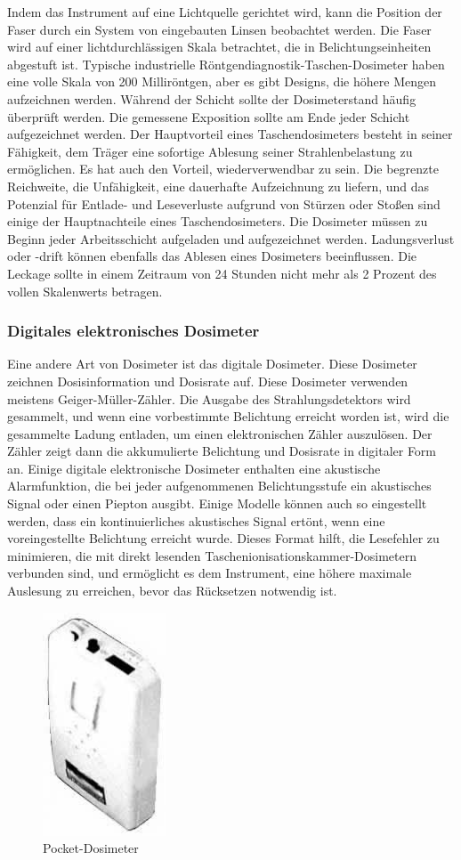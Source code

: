 {Indem das Instrument auf eine Lichtquelle gerichtet wird, kann die Position der Faser durch ein System von eingebauten Linsen beobachtet werden. Die Faser wird auf einer lichtdurchlässigen Skala betrachtet, die in Belichtungseinheiten abgestuft ist. Typische industrielle Röntgendiagnostik-Taschen-Dosimeter haben eine volle Skala von 200 Milliröntgen, aber es gibt Designs, die höhere Mengen aufzeichnen werden. Während der Schicht sollte der Dosimeterstand häufig überprüft werden. Die gemessene Exposition sollte am Ende jeder Schicht aufgezeichnet werden.
Der Hauptvorteil eines Taschendosimeters besteht in seiner Fähigkeit, dem Träger eine sofortige Ablesung seiner Strahlenbelastung zu ermöglichen. Es hat auch den Vorteil, wiederverwendbar zu sein. Die begrenzte Reichweite, die Unfähigkeit, eine dauerhafte Aufzeichnung zu liefern, und das Potenzial für Entlade- und Leseverluste aufgrund von Stürzen oder Stoßen sind einige der Hauptnachteile eines Taschendosimeters. Die Dosimeter müssen zu Beginn jeder Arbeitsschicht aufgeladen und aufgezeichnet werden. Ladungsverlust oder -drift können ebenfalls das Ablesen eines Dosimeters beeinflussen. Die Leckage sollte in einem Zeitraum von 24 Stunden nicht mehr als 2 Prozent des vollen Skalenwerts betragen.
\subsubsection{Digitales elektronisches Dosimeter}
Eine andere Art von Dosimeter ist das digitale Dosimeter. Diese Dosimeter zeichnen Dosisinformation und Dosisrate auf. Diese Dosimeter verwenden meistens Geiger-Müller-Zähler. Die Ausgabe des Strahlungsdetektors wird gesammelt, und wenn eine vorbestimmte Belichtung erreicht worden ist, wird die gesammelte Ladung entladen, um einen elektronischen Zähler auszulösen.
Der Zähler zeigt dann die akkumulierte Belichtung und Dosisrate in digitaler Form an.
Einige digitale elektronische Dosimeter enthalten eine akustische Alarmfunktion, die bei jeder aufgenommenen Belichtungsstufe ein akustisches Signal oder einen Piepton ausgibt. Einige Modelle können auch so eingestellt werden, dass ein kontinuierliches akustisches Signal ertönt, wenn eine voreingestellte Belichtung erreicht wurde. Dieses Format hilft, die Lesefehler zu minimieren, die mit direkt lesenden Taschenionisationskammer-Dosimetern verbunden sind, und ermöglicht es dem Instrument, eine höhere maximale Auslesung zu erreichen, bevor das Rücksetzen notwendig ist.
\begin{figure}[htb]
\centering
  \includegraphics[scale=0.3]{img/Digital-Dosimeter.jpg}
  \caption{Pocket-Dosimeter}
  \label{fig:Pocket-Dosimeter}
\end{figure}
}
